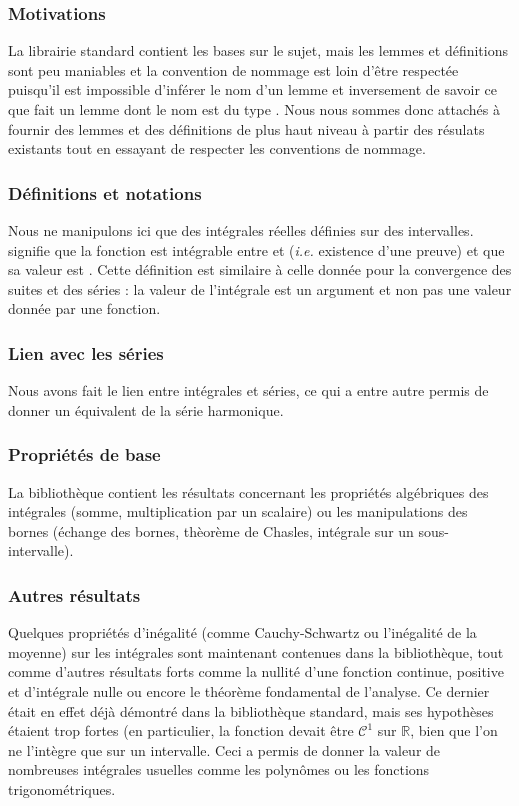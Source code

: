 \subsubsection{Motivations}
	La librairie standard contient les bases sur le sujet, mais les lemmes et définitions sont peu maniables et la convention de nommage est loin d'être respectée puisqu'il est impossible d'inférer le nom d'un lemme et inversement de savoir ce que fait un lemme dont le nom est du type .
	Nous nous sommes donc attachés à fournir des lemmes et des définitions de plus haut niveau à partir des résulats existants tout en essayant de respecter les conventions de nommage.

\subsubsection{Définitions et notations}
	Nous ne manipulons ici que des intégrales réelles définies sur des intervalles.  signifie que la fonction  est intégrable entre  et  (\emph{i.e.} existence d'une preuve) et que sa valeur est . Cette définition est similaire à celle donnée pour la convergence des suites et des séries : la valeur de l'intégrale est un argument et non pas une valeur donnée par une fonction.
	
	\subsubsection{Lien avec les séries}
		Nous avons fait le lien entre intégrales et séries, ce qui a entre autre permis de donner un équivalent de la série harmonique.
	
\subsubsection{Propriétés de base}
	La bibliothèque contient les résultats concernant les propriétés algébriques des intégrales (somme, multiplication par un scalaire) ou les manipulations des bornes (échange des bornes, thèorème de Chasles, intégrale sur un sous-intervalle).
	
	\subsubsection{Autres résultats}
	Quelques propriétés d'inégalité (comme Cauchy-Schwartz ou l'inégalité de la moyenne) sur les intégrales sont maintenant contenues dans la bibliothèque, tout comme d'autres résultats forts comme la nullité d'une fonction continue, positive et d'intégrale nulle ou encore le théorème fondamental de l'analyse. 
	Ce dernier était en effet déjà démontré dans la bibliothèque standard, mais ses hypothèses étaient trop fortes (en particulier, la fonction devait être $\mathcal{C}^1$ sur $\mathbb{R}$, bien que l'on ne l'intègre que sur un intervalle. Ceci a permis de donner la valeur de nombreuses intégrales usuelles comme les polynômes ou les fonctions trigonométriques.
	
